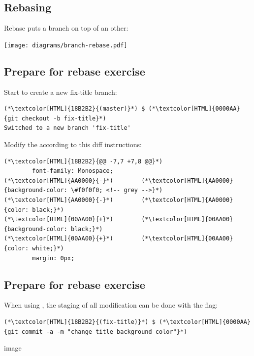\subsection{Rebasing}
\begin{frame}[fragile]
  \subslidetitle
  Rebase puts a branch on top of an other:
  \centerline{\texttt{[image: diagrams/branch-rebase.pdf]}}
\end{frame}

\subsection{Prepare for rebase exercise}
\begin{frame}[fragile]
  \subslidetitle

  Start to create a new fix-title branch:
  \begin{lstlisting}
(*\textcolor[HTML]{18B2B2}{(master)}*) $ (*\textcolor[HTML]{0000AA}{git checkout -b fix-title}*)
Switched to a new branch 'fix-title'
\end{lstlisting}

  Modify the  according to this diff instructions:
  \begin{lstlisting}
(*\textcolor[HTML]{18B2B2}{@@ -7,7 +7,8 @@}*)
        font-family: Monospace;
(*\textcolor[HTML]{AA0000}{-}*)        (*\textcolor[HTML]{AA0000}{background-color: \#f0f0f0; <!-- grey -->}*)
(*\textcolor[HTML]{AA0000}{-}*)        (*\textcolor[HTML]{AA0000}{color: black;}*)
(*\textcolor[HTML]{00AA00}{+}*)        (*\textcolor[HTML]{00AA00}{background-color: black;}*)
(*\textcolor[HTML]{00AA00}{+}*)        (*\textcolor[HTML]{00AA00}{color: white;}*)
        margin: 0px;
\end{lstlisting}
\end{frame}

\subsection{Prepare for rebase exercise}
\begin{frame}[fragile]
  \subslidetitle
  When using , the staging of all modification can be done with the  flag:
  \begin{lstlisting}
(*\textcolor[HTML]{18B2B2}{(fix-title)}*) $ (*\textcolor[HTML]{0000AA}{git commit -a -m "change title background color"}*)
\end{lstlisting}

  image
\end{frame}

